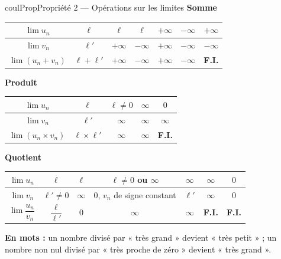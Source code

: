 \documentclass[11pt,a4paper]{article}
\makeatletter
\newcounter{lycee@signet}
\newcommand{\signet}[3][]{\stepcounter{lycee@signet}%
  \edef\lycee@dest{\if\relax\detokenize{#1}\relax
    signet.\arabic{lycee@signet}\else#1\fi}%
  \hypertarget{\lycee@dest}{}\bookmark[level=#2,dest=\lycee@dest]{#3}}
\newenvironment{proprietebox}[1][Propriété]%
  {\begin{boitecours}[phantom={\signet{2}{#1}}]{coulProp}{#1}}{\end{boitecours}}
\makeatother
\begin{document}
\begin{proprietebox}[Propriété 2 --- Opérations sur les limites]
\textbf{Somme}

\smallskip
\begin{center}
{\renewcommand{\arraystretch}{1.8}\setlength{\tabcolsep}{7pt}%
\begin{tabular}{|c|c|c|c|c|c|c|}
\hline
$\lim u_{n}$ & $\ell$ & $\ell$ & $\ell$ & $+\infty$ & $-\infty$ & $+\infty$\\ \hline
$\lim v_{n}$ & $\ell'$ & $+\infty$ & $-\infty$ & $+\infty$ & $-\infty$ & $-\infty$\\ \hline
$\lim (u_{n}+v_{n})$ & $\ell+\ell'$ & $+\infty$ & $-\infty$ & $+\infty$ & $-\infty$ &
\textbf{F.I.}\\ \hline
\end{tabular}}
\end{center}

\textbf{Produit}

\smallskip
\begin{center}
{\renewcommand{\arraystretch}{1.8}\setlength{\tabcolsep}{7pt}%
\begin{tabular}{|c|c|c|c|c|}
\hline
$\lim u_{n}$ & $\ell$ & $\ell\neq 0$ & $\infty$ & $0$\\ \hline
$\lim v_{n}$ & $\ell'$ & $\infty$ & $\infty$ & $\infty$\\ \hline
$\lim (u_{n}\times v_{n})$ & $\ell\times\ell'$ & $\infty$ & $\infty$ & \textbf{F.I.}\\ \hline
\end{tabular}}
\end{center}

\textbf{Quotient}

\smallskip
\begin{center}
{\renewcommand{\arraystretch}{2.4}\setlength{\tabcolsep}{6pt}%
\begin{tabular}{|c|c|c|c|c|c|c|}
\hline
$\lim u_{n}$ & $\ell$ & $\ell$ & $\ell\neq 0$ ou $\infty$ & $\infty$ & $\infty$ & $0$\\ \hline
$\lim v_{n}$ & $\ell'\neq 0$ & $\infty$ & $0$, $v_{n}$ de signe constant & $\ell'$ & $\infty$ & $0$\\ \hline
$\lim \dfrac{u_{n}}{v_{n}}$ & $\dfrac{\ell}{\ell'}$ & $0$ & $\infty$ & $\infty$ &
\textbf{F.I.} & \textbf{F.I.}\\ \hline
\end{tabular}}
\end{center}

\textbf{En mots :} un nombre divisé par « très grand » devient « très petit » ; un nombre
non nul divisé par « très proche de zéro » devient « très grand ».
\end{proprietebox}
\end{document}
